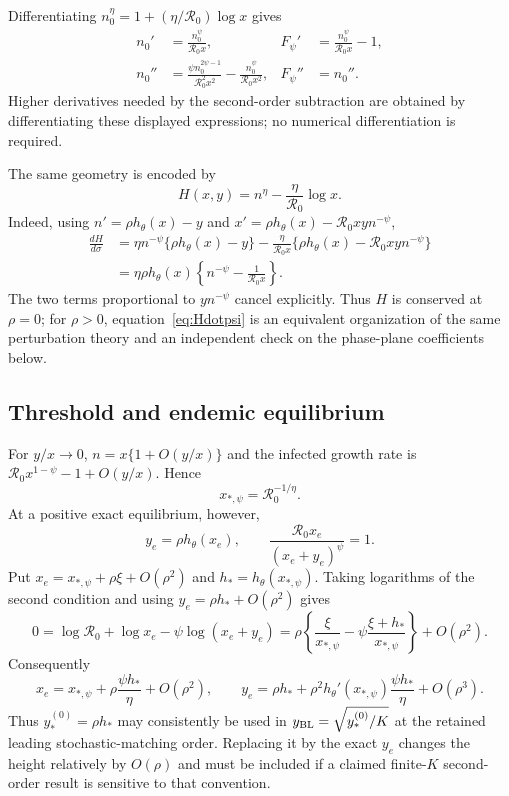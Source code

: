 \documentclass[11pt,a4paper]{article}
\newcommand{\Rzero}{\mathcal R_0}
\begin{document}
Differentiating $n_0^\eta=1+(\eta/\Rzero)\log x$ gives
\begin{align}
 n_0'&=\frac{n_0^\psi}{\Rzero x},
 &F_\psi'&=\frac{n_0^\psi}{\Rzero x}-1,\nonumber\\
 n_0''&=\frac{\psi n_0^{2\psi-1}}{\Rzero^2x^2}
       -\frac{n_0^\psi}{\Rzero x^2},
 &F_\psi''&=n_0''.
 \label{eq:Fpsi-derivatives}
\end{align}
Higher derivatives needed by the second-order subtraction are obtained by
differentiating these displayed expressions; no numerical differentiation is
required.

The same geometry is encoded by
\[
 H(x,y)=n^\eta-\frac\eta{\Rzero}\log x.
\]
Indeed, using $n'=\rho h_\theta(x)-y$ and
$x'=\rho h_\theta(x)-\Rzero xy n^{-\psi}$,
\begin{align}
 \frac{dH}{d\sigma}
 &=\eta n^{-\psi}\{\rho h_\theta(x)-y\}
 -\frac\eta{\Rzero x}
 \{\rho h_\theta(x)-\Rzero xy n^{-\psi}\}\nonumber\\
 &=\eta\rho h_\theta(x)
 \left\{n^{-\psi}-\frac1{\Rzero x}\right\}.
 \label{eq:Hdotpsi}
\end{align}
The two terms proportional to $y n^{-\psi}$ cancel explicitly.  Thus $H$ is
conserved at $\rho=0$; for $\rho>0$, equation~\eqref{eq:Hdotpsi} is an
equivalent organization of the same perturbation theory and an independent
check on the phase-plane coefficients below.

\subsection{Threshold and endemic equilibrium}
For $y/x\to0$, $n=x\{1+O(y/x)\}$ and the infected growth rate is
$\Rzero x^{1-\psi}-1+O(y/x)$.  Hence
\begin{equation}
 x_{*,\psi}=\Rzero^{-1/\eta}.
 \label{eq:xstarpsi}
\end{equation}
At a positive exact equilibrium, however,
\begin{equation}
 y_e=\rho h_\theta(x_e),\qquad
 \frac{\Rzero x_e}{(x_e+y_e)^\psi}=1.
 \label{eq:endemic-psi}
\end{equation}
Put $x_e=x_{*,\psi}+\rho\xi+O(\rho^2)$ and
$h_*=h_\theta(x_{*,\psi})$.  Taking logarithms of the second condition and
using $y_e=\rho h_*+O(\rho^2)$ gives
\[
 0=\log\Rzero+\log x_e-\psi\log(x_e+y_e)
 =\rho\left\{\frac\xi{x_{*,\psi}}
 -\psi\frac{\xi+h_*}{x_{*,\psi}}\right\}+O(\rho^2).
\]
Consequently
\begin{equation}
 x_e=x_{*,\psi}+\rho\frac{\psi h_*}{\eta}+O(\rho^2),\qquad
 y_e=\rho h_*+\rho^2h_\theta'(x_{*,\psi})
       \frac{\psi h_*}{\eta}+O(\rho^3).
 \label{eq:endemic-expansion-psi}
\end{equation}
Thus $y_*^{(0)}=\rho h_*$ may consistently be used in
$y_{\rm BL}=\sqrt{y_*^{(0)}/K}$ at the retained leading stochastic-matching
order.  Replacing it by the exact $y_e$ changes the height relatively by
$O(\rho)$ and must be included if a claimed finite-$K$ second-order result is
sensitive to that convention.
\end{document}
